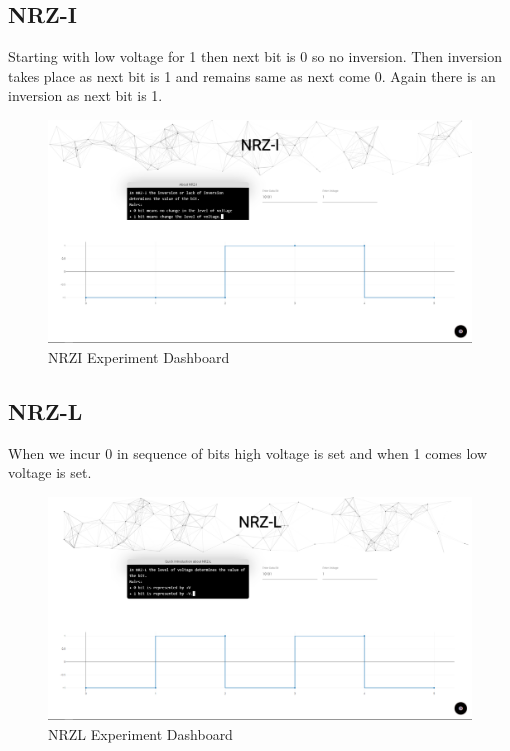 \documentclass[10pt,journal,compsoc]{IEEEtran}
\begin{document}
\subsection{NRZ-I }

Starting with low voltage for 1 then next bit is 0 so no inversion. Then inversion takes place as next bit is 1 and remains same as next come 0. Again there is an inversion as next bit is 1.

\begin{figure}[H]
\centering
\includegraphics[scale=0.15]{nrzi.png}
\caption{NRZI Experiment Dashboard}
\end{figure}

\subsection{NRZ-L}

When we incur  0 in sequence of bits high voltage is set and when 1 comes low voltage is set.

\begin{figure}[H]
\centering
\includegraphics[scale=0.15]{nrzl.png}
\caption{NRZL Experiment Dashboard}
\end{figure}
\end{document}
